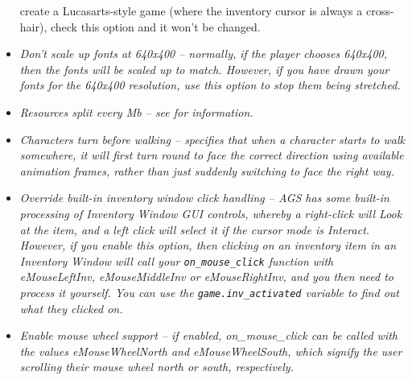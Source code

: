 \begin{itemize}
create a Lucasarts-style game (where the inventory cursor is always a
cross-hair), check this option and it won't be changed.
\item \it{Don't scale up fonts at 640x400} -- normally, if the player chooses 640x400, then
the fonts will be scaled up to match. However, if you have drawn your fonts
for the 640x400 resolution, use this option to stop them being stretched.
\item \it{Resources split every Mb} -- see  for information.
\item \it{Characters turn before walking} -- specifies that when a character starts
to walk somewhere, it will first turn round to face the correct direction
using available animation frames, rather than just suddenly switching to
face the right way.
\item \it{Override built-in inventory window click handling} -- AGS has some built-in processing
of Inventory Window GUI controls, whereby a right-click will Look at the item, and a left click
will select it if the cursor mode is Interact. However, if you enable this
option, then clicking on an inventory item in an Inventory Window will call your \verb$on_mouse_click$
function  with eMouseLeftInv, eMouseMiddleInv or eMouseRightInv, and you then need to process it
yourself. You can use the \verb$game.inv_activated$ variable to find out what they clicked on.
\item \it{Enable mouse wheel support} -- if enabled, on_mouse_click can be called with
the values eMouseWheelNorth and eMouseWheelSouth, which signify the user scrolling their mouse
wheel north or south, respectively.


\end{itemize}
